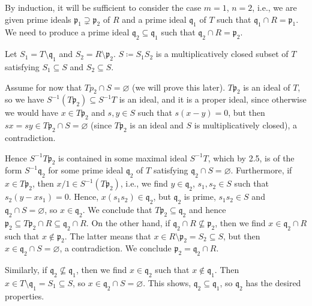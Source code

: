 By induction, it will be sufficient to consider the case $m = 1$, $n = 2$, i.e.,
we are given prime ideals $\mathfrak{p}_1 \supsetneq \mathfrak{p}_2$ of $R$ and
a prime ideal $\mathfrak{q}_1$ of $T$ such that $\mathfrak{q}_1\cap R = \mathfrak{p}_1$.
We need to produce a prime ideal $\mathfrak{q}_2 \subseteq \mathfrak{q}_1$ such that
$\mathfrak{q}_2\cap R = \mathfrak{p}_2$.

Let $S_1 = T\setminus \mathfrak{q}_1$ and $S_2 = R\setminus \mathfrak{p}_2$.
$S\coloneqq S_1S_2$ is a multiplicatively closed subset of $T$ satisfying
$S_1 \subseteq S$ and $S_2 \subseteq S$.

Assume for now that $Tp_2\cap S = \varnothing$ (we will prove this later).
$T \mathfrak{p}_2$ is an ideal of $T$, so we have $S^{-1}(T \mathfrak{p}_2) \subseteq S^{-1} T$
is an ideal, and it is a proper ideal, since otherwise we would have
$x \in T \mathfrak{p}_2$ and $s, y \in S$ such that $s(x-y) = 0$, but then
$sx = sy \in T \mathfrak{p}_2 \cap S = \varnothing$ (since $T \mathfrak{p}_2$ is
an ideal and $S$ is multiplicatively closed), a contradiction.

Hence $S^{-1} T \mathfrak{p}_2$ is contained in some maximal ideal $S^{-1}T$, which
by 2.5, is of the form $S^{-1} \mathfrak{q}_2$ for some prime ideal $\mathfrak{q}_2$
of $T$ satisfying $\mathfrak{q}_2\cap S = \varnothing$. Furthermore, if
$x \in T \mathfrak{p}_2$, then $x/1 \in S^{-1}(T \mathfrak{p}_2)$, i.e., we find
$y \in \mathfrak{q}_2$, $s_1, s_2 \in S$ such that $s_2(y - xs_1) = 0$. Hence,
$x(s_1s_2) \in \mathfrak{q}_2$, but $\mathfrak{q}_2$ is prime, $s_1s_2 \in S$ and
$\mathfrak{q}_2\cap S = \varnothing$, so $x \in \mathfrak{q}_2$. We conclude that
$T \mathfrak{p}_2 \subseteq \mathfrak{q}_2$ and hence
$\mathfrak{p}_2 \subseteq T \mathfrak{p}_2 \cap R \subseteq \mathfrak{q}_2 \cap R$.
On the other hand, if $\mathfrak{q}_2 \cap R \nsubseteq \mathfrak{p}_2$, then
we find $x \in \mathfrak{q}_2\cap R$ such that $x\notin \mathfrak{p}_2$. The
latter means that $x \in R\setminus \mathfrak{p}_2 = S_2 \subseteq S$, but then
$x \in \mathfrak{q}_2 \cap S = \varnothing$, a contradiction. We conclude
$\mathfrak{p}_2 = \mathfrak{q}_2\cap R$.

Similarly, if $\mathfrak{q_2} \nsubseteq \mathfrak{q}_1$, then we find
$x \in \mathfrak{q}_2$ such that $x\notin \mathfrak{q}_1$. Then
$x \in T\setminus \mathfrak{q}_1 = S_1 \subseteq S$, so $x \in \mathfrak{q}_2 \cap S = \varnothing$.
This shows, $\mathfrak{q}_2 \subseteq \mathfrak{q}_1$, so $\mathfrak{q}_2$ has
the desired properties.

